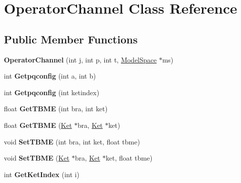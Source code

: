 \hypertarget{classOperatorChannel}{\section{Operator\-Channel Class Reference}
\label{classOperatorChannel}
}
\subsection*{Public Member Functions}
\begin{DoxyCompactItemize}
\item 
\hypertarget{classOperatorChannel_a25fa1872ac90763dc9031672b7beec98}{{\bfseries Operator\-Channel} (int j, int p, int t, \hyperlink{classModelSpace}{Model\-Space} $\ast$ms)}\label{classOperatorChannel_a25fa1872ac90763dc9031672b7beec98}

\item 
\hypertarget{classOperatorChannel_ae2bc7a0cd347085106de914b27651e7d}{int {\bfseries Getpqconfig} (int a, int b)}\label{classOperatorChannel_ae2bc7a0cd347085106de914b27651e7d}

\item 
\hypertarget{classOperatorChannel_ad02faf787c51d8af956838924d3cc8c1}{int {\bfseries Getpqconfig} (int ketindex)}\label{classOperatorChannel_ad02faf787c51d8af956838924d3cc8c1}

\item 
\hypertarget{classOperatorChannel_a6cdb27dc54c1003052e96613aa12a407}{float {\bfseries Get\-T\-B\-M\-E} (int bra, int ket)}\label{classOperatorChannel_a6cdb27dc54c1003052e96613aa12a407}

\item 
\hypertarget{classOperatorChannel_a36c759cc1da80efb73ea35161c78db05}{float {\bfseries Get\-T\-B\-M\-E} (\hyperlink{classKet}{Ket} $\ast$bra, \hyperlink{classKet}{Ket} $\ast$ket)}\label{classOperatorChannel_a36c759cc1da80efb73ea35161c78db05}

\item 
\hypertarget{classOperatorChannel_af1bc23d407e93691752dcf2363ef7633}{void {\bfseries Set\-T\-B\-M\-E} (int bra, int ket, float tbme)}\label{classOperatorChannel_af1bc23d407e93691752dcf2363ef7633}

\item 
\hypertarget{classOperatorChannel_a1d5144ed83cec81c6882e2db0c35c5fb}{void {\bfseries Set\-T\-B\-M\-E} (\hyperlink{classKet}{Ket} $\ast$bra, \hyperlink{classKet}{Ket} $\ast$ket, float tbme)}\label{classOperatorChannel_a1d5144ed83cec81c6882e2db0c35c5fb}

\item 
\hypertarget{classOperatorChannel_aee19d08a2324d83c8b83aa87d3a1848e}{int {\bfseries Get\-Ket\-Index} (int i)}\label{classOperatorChannel_aee19d08a2324d83c8b83aa87d3a1848e}

\end{DoxyCompactItemize}
